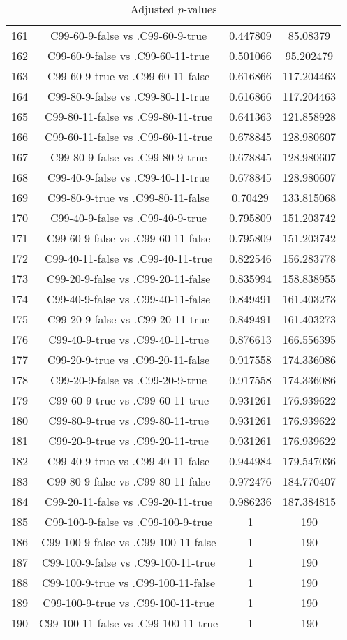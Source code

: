 \documentclass[a4paper,10pt]{article}
\begin{document}
\begin{landscape}
\begin{table}[!htp]
\begin{tabular}{cccc}
161&C99-60-9-false vs .C99-60-9-true&0.447809&85.08379\\
162&C99-60-9-false vs .C99-60-11-true&0.501066&95.202479\\
163&C99-60-9-true vs .C99-60-11-false&0.616866&117.204463\\
164&C99-80-9-false vs .C99-80-11-true&0.616866&117.204463\\
165&C99-80-11-false vs .C99-80-11-true&0.641363&121.858928\\
166&C99-60-11-false vs .C99-60-11-true&0.678845&128.980607\\
167&C99-80-9-false vs .C99-80-9-true&0.678845&128.980607\\
168&C99-40-9-false vs .C99-40-11-true&0.678845&128.980607\\
169&C99-80-9-true vs .C99-80-11-false&0.70429&133.815068\\
170&C99-40-9-false vs .C99-40-9-true&0.795809&151.203742\\
171&C99-60-9-false vs .C99-60-11-false&0.795809&151.203742\\
172&C99-40-11-false vs .C99-40-11-true&0.822546&156.283778\\
173&C99-20-9-false vs .C99-20-11-false&0.835994&158.838955\\
174&C99-40-9-false vs .C99-40-11-false&0.849491&161.403273\\
175&C99-20-9-false vs .C99-20-11-true&0.849491&161.403273\\
176&C99-40-9-true vs .C99-40-11-true&0.876613&166.556395\\
177&C99-20-9-true vs .C99-20-11-false&0.917558&174.336086\\
178&C99-20-9-false vs .C99-20-9-true&0.917558&174.336086\\
179&C99-60-9-true vs .C99-60-11-true&0.931261&176.939622\\
180&C99-80-9-true vs .C99-80-11-true&0.931261&176.939622\\
181&C99-20-9-true vs .C99-20-11-true&0.931261&176.939622\\
182&C99-40-9-true vs .C99-40-11-false&0.944984&179.547036\\
183&C99-80-9-false vs .C99-80-11-false&0.972476&184.770407\\
184&C99-20-11-false vs .C99-20-11-true&0.986236&187.384815\\
185&C99-100-9-false vs .C99-100-9-true&1&190\\
186&C99-100-9-false vs .C99-100-11-false&1&190\\
187&C99-100-9-false vs .C99-100-11-true&1&190\\
188&C99-100-9-true vs .C99-100-11-false&1&190\\
189&C99-100-9-true vs .C99-100-11-true&1&190\\
190&C99-100-11-false vs .C99-100-11-true&1&190\\
\hline
\end{tabular}
\caption{Adjusted $p$-values}
\end{table}

\end{landscape}
\end{document}
